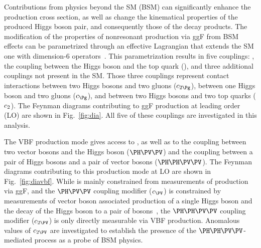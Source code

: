 \documentclass[11pt,twoside,a4paper,cmspaper,final,collab]{cms-tdr}
\begin{document}
Contributions from physics beyond the SM (BSM) can 
significantly enhance the \HH production cross section, as well as change the kinematical properties 
of the produced Higgs boson pair, and consequently those of the decay products.
 The modification of the properties of nonresonant \HH production via ggF from BSM effects can be parametrized through an effective Lagrangian that extends the SM one with dimension-6 operators~\cite{deFlorian:2016spz}. This parametrization results in five couplings: \lbdHHH, the coupling between the Higgs boson and the top quark (\yt), and three additional couplings not present in the SM. Those three couplings represent contact interactions between two Higgs bosons and two gluons ($\cgg$), between one Higgs boson and two gluons ($\cg$), and between two Higgs bosons and two top quarks ($c_2$). The Feynman diagrams contributing to ggF \HH production at leading order (LO) are shown in Fig.~\ref{fig:dia}. All five of these couplings are investigated in this analysis.

The VBF \HH production mode gives access to \lbdHHH, as well as to the coupling between two vector bosons and the Higgs boson ($\HVV$) and the coupling between a pair of Higgs bosons and a pair of vector bosons ($\HHVV$). The Feynman diagrams contributing to this production mode at LO are shown in Fig.~\ref{fig:diavbf}. While \lbdHHH is mainly constrained from measurements of \HH production via ggF, and the $\HVV$ coupling modifier ($\conev$) is constrained by measurements of vector boson associated production of a single Higgs boson and the decay of the Higgs boson to a pair of bosons~\cite{Sirunyan:2018koj}, the $\HHVV$ coupling modifier ($\ctwov$) is only directly measurable via VBF \HH production. Anomalous values of $\ctwov$ are investigated to establish the presence of the $\HHVV$-mediated process as a probe of BSM physics.
\end{document}
